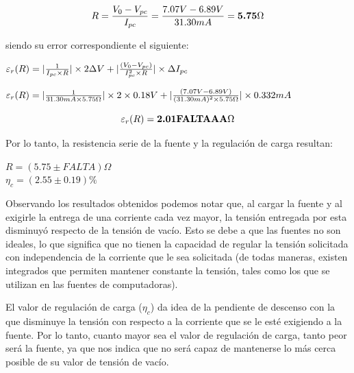 \documentclass{article}
\begin{document}
\begin{equation}
	R = {V_{0} - V_{pc} \over I_{pc}} = {7.07V - 6.89V \over 31.30mA} = \textbf{5.75$\Omega$} \\
\end{equation}
\bigskip


\noindent siendo su error correspondiente el siguiente:
\bigskip


\begin{center}
	$\varepsilon_r(R) = |{1\over I_{pc} \times R}|\times 2\Delta V + |{(V_{0}-V_{pc})  \over  I_{pc}^2  \times R}| \times \Delta I_{pc} $ \\
\end{center}

\begin{center}
	$\varepsilon_r(R) = |{1\over 31.30mA \times 5.75\Omega}|\times 2\times 0.18V+ |{(7.07V-6.89V)  \over  (31.30mA)^2  \times 5.75\Omega}| \times 0.332mA$ \\
\end{center}

\begin{equation}
	\varepsilon_r(R) = \textbf{2.01FALTAAA$\Omega$} \\
\end{equation}
\bigskip\bigskip


\noindent Por lo tanto, la resistencia serie de la fuente y la regulación de carga resultan:
\medskip

\begin{center}
	$R = (5.75 \pm FALTA)\Omega $ \\ \medskip
	$\eta_c = (2.55 \pm 0.19)\% $ 
\end{center}
\bigskip\bigskip



	Observando los resultados obtenidos podemos notar que, al cargar la fuente y al exigirle la entrega de una corriente cada vez mayor, la tensión entregada por esta disminuyó respecto de la tensión de vacío. Esto se debe a que las fuentes no son ideales, lo que significa que no tienen la capacidad de regular la tensión solicitada con independencia de la corriente que le sea solicitada (de todas maneras, existen integrados que permiten mantener constante la tensión, tales como los que se utilizan en las fuentes de computadoras).
	\par
	El valor de regulación de carga ($\eta_c$) da idea de la pendiente de descenso con la que disminuye la tensión con respecto a la corriente que se le esté exigiendo a la fuente. Por lo tanto, cuanto mayor sea el valor de regulación de carga, tanto peor será la fuente, ya que nos indica que no será capaz de mantenerse lo más cerca posible de su valor de tensión de vacío.
\bigskip\bigskip\medskip
\end{document}
